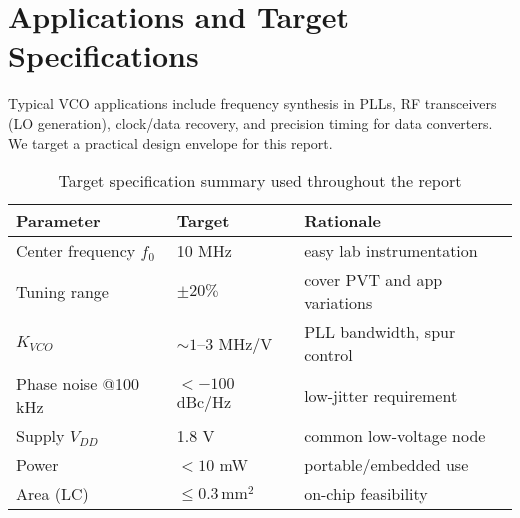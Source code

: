 \section{Applications and Target Specifications}
Typical VCO applications include frequency synthesis in PLLs, RF transceivers (LO generation), clock/data recovery, and precision timing for data converters. We target a practical design envelope for this report.

\begin{table}[H]
  \centering
  \begin{tabular}{lll}
    \toprule
    Parameter & Target & Rationale \\
    \midrule
    Center frequency $f_0$ & 10 MHz & easy lab instrumentation \\
    Tuning range & $\pm20\%$ & cover PVT and app variations \\
    $K_{VCO}$ & $\sim 1$–$3$ MHz/V & PLL bandwidth, spur control \\
    Phase noise @100 kHz & $< -100$ dBc/Hz & low-jitter requirement \\
    Supply $V_{DD}$ & 1.8 V & common low-voltage node \\
    Power & $< 10$ mW & portable/embedded use \\
    Area (LC) & $\le 0.3\,\mathrm{mm}^2$ & on-chip feasibility \\
    \bottomrule
  \end{tabular}
  \caption{Target specification summary used throughout the report}
\end{table}

